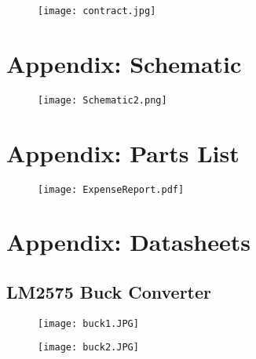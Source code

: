 \documentclass[11pt,letter]{article}
\begin{document}
\begin{figure}[H]
    \centering
    \texttt{[image: contract.jpg]}
\end{figure}

\section{Appendix: Schematic}
\begin{figure}[H]
    \centering
    \texttt{[image: Schematic2.png]}
\end{figure}

\section{Appendix: Parts List}

\begin{figure}[H]
    \centering
    \texttt{[image: ExpenseReport.pdf]}
\end{figure}

\newpage

\section{Appendix: Datasheets}

\subsection{LM2575 Buck Converter}

\begin{figure}[H]
    \centering
    \texttt{[image: buck1.JPG]}
\end{figure}

\begin{figure}[H]
    \centering
    \texttt{[image: buck2.JPG]}
\end{figure}

\newpage



\end{document}
